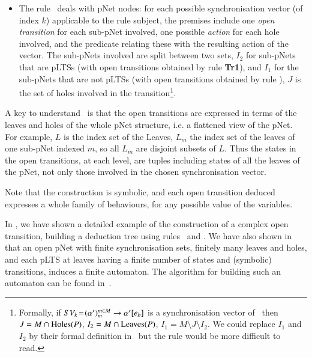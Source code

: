 \documentclass{elsarticle}
\newcommand{\TODO}[1]{\textcolor{red}{\textbf{[TODO:#1]}}}
\begin{document}
\begin{definition}
\begin{itemize}
\item	The  rule \TrDeux\ deals with pNet nodes: for each possible
	synchronisation vector (of index $k$) applicable to the rule subject, the premises 
	include one {\em open transition} for each sub-pNet involved, one possible
	{\em action} for each hole involved, and the predicate relating these
	with the resulting action of the vector. The sub-pNets involved are split between two 
	sets, $I_2$ for sub-pNets that are pLTSs (with open transitions obtained by rule \textbf{Tr1}), and $I_1$ for the sub-pNets that are not pLTSs (with open transitions obtained by rule \TrDeux), $J$ is the set of 
	holes involved in the transition\footnote{Formally, if $SV_k \!=\! ({\alpha'})_m^{m 
	\in M}\to \alpha' [e_b]$ is a synchronisation vector  of \pNet\  then $J=M\cap 
	\operatorname{Holes}(P)$, $I_2=M\cap \operatorname{Leaves}(P)$,  $I_1=M\setminus J \setminus 
	I_2$. We could replace $I_1$ and $I_2$ by their formal definition in \TrDeux\ but the rule would be more difficult to read.}.   
\end{itemize}                                                                  

\end{definition}
        	A key to understand \TrDeux\ is that the open transitions are
	expressed in terms of the leaves and holes of the whole pNet structure,
	i.e. a flattened view of the pNet. For example, $L$ is the index set of the
	Leaves, $L_m$ the index set of the leaves of one sub-pNet indexed $m$, so all $L_m$
	are disjoint subsets of $L$. Thus the states in the open transitions,
	at each level, are tuples including states of all the
	leaves of the pNet, not only those involved in the chosen
	synchronisation vector.


Note that  the construction is symbolic, and each open transition deduced expresses a whole family of
behaviours, for any possible value of the variables.
%

In \cite{henrio:Forte2016}, we have  shown a detailed example of the construction of a complex open transition, building a deduction tree using rules \TrUn ~and \TrDeux.
We have also shown in \cite{henrio:Forte2016} that an open pNet
with finite synchronisation sets, finitely many leaves and
holes, and each pLTS at leaves having a finite number of states and
(symbolic) transitions, induces a finite automaton. The algorithm for building such an automaton can be found in~\cite{QBMZ-AVOCS18}.
\end{document}

